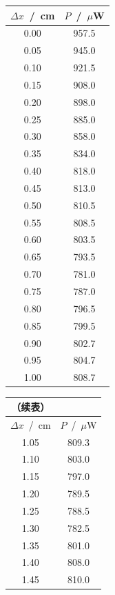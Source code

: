 \documentclass[a4paper]{article}%
\begin{document}
\begin{table}[H]
\begin{minipage}{0.2\linewidth}
  \centering
  \begin{tabular}{cc}
      \toprule
      $\Delta x$~/~cm & $P$~/~$\mu$W\\
      \midrule
      0.00 	&	957.5 	\\
      0.05 	&	945.0 	\\
      0.10 	&	921.5 	\\
      0.15 	&	908.0 	\\
      0.20 	&	898.0 	\\
      0.25 	&	885.0 	\\
      0.30 	&	858.0 	\\
      0.35 	&	834.0 	\\
      0.40 	&	818.0 	\\
      0.45 	&	813.0 	\\
      0.50 	&	810.5 	\\
      0.55 	&	808.5 	\\
      0.60 	&	803.5 	\\
      0.65 	&	793.5 	\\
      0.70 	&	781.0 	\\
      0.75 	&	787.0 	\\
      0.80 	&	796.5 	\\
      0.85 	&	799.5 	\\
      0.90 	&	802.7 	\\
      0.95 	&	804.7 	\\
      1.00 	&	808.7 	\\
      \bottomrule
  \end{tabular}
\end{minipage}
\begin{minipage}{0.29\linewidth}
\centering
\begin{tabular}{cc}
  （续表）\\
    \toprule
    $\Delta x$~/~cm & $P$~/~$\mu$W\\
    \midrule
    1.05 	&	809.3 	\\
    1.10 	&	803.0 	\\
    1.15 	&	797.0 	\\
    1.20 	&	789.5 	\\
    1.25 	&	788.5 	\\
    1.30 	&	782.5 	\\
    1.35 	&	801.0 	\\
    1.40 	&	808.0 	\\
    1.45 	&	810.0 	\\

\end{tabular}
\end{minipage}
\end{table}
\end{document}
